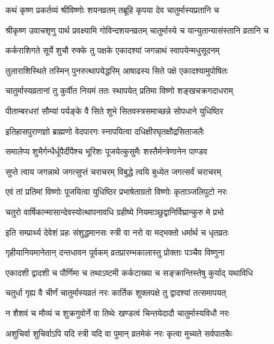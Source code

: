 
\twolineshloka
{कथं कृष्ण प्रकर्तव्यं श्रीविष्णोः शयनव्रतम्}
{तब्रूहि कृपया देव चातुर्मास्यप्रतानि च} %

\twolineshloka
{श्रीकृष्ण उवाचशृणु पार्थ प्रवक्ष्यामि गोविन्दशयनव्रतम्}
{चातुर्मास्ये च यान्युतान्यासंस्तानि व्रतानि च} %

\twolineshloka
{कर्कराशिगते सूर्ये शुचौ रुक्के तु पक्षके}
{एकादश्यां जगन्नाथं स्वापयेन्मधुसूदनम्} %

\twolineshloka
{तुलाराशिस्थिते तस्मिन् पुनरुत्थापयेद्धरिम्}
{आषाढस्य सिते पक्षे एकादश्यामुपोषितः} %

\twolineshloka
{चातुर्मास्यव्रतानां तु कुर्वीत नियमं ततः}
{स्थापयेत् प्रतिमा विष्णो शङ्खचक्रगदाधराम्} %

\twolineshloka
{पीताम्बरधरां सौम्यां पर्यङ्के वै सिते शुभे}
{सितवस्त्रसमाच्छन्ने सोपधाने युधिष्ठिर} %

\twolineshloka
{इतिहासपुराणज्ञो ब्राह्मणो वेदपारगः}
{स्नापयित्वा दधिक्षीरघृतक्षौद्रसिताजलैः} %

\twolineshloka
{समालेप्य शुभैर्गन्धैर्धूपैर्दीपैश्च भूरिशः}
{पूजयेत्कुसुमैः शस्तैर्मन्त्रेणानेन पाण्डव} %

\twolineshloka
{सुप्ते त्वाय जगन्नाथे जगत्सुप्तं चराचरम्}
{विबुद्धे त्वयि बुध्येत जगत्सर्वं चराचरम्} %

\twolineshloka
{एवं तां प्रतिमां विष्णोः पूजयित्वा युधिष्ठिर}
{प्रभाषेताग्रतो विष्णोः कृताञ्जलिपुटो नरः} %

\twolineshloka
{चतुरो वार्षिकान्मासान्देवस्योत्थापनावधि}
{ग्रहीष्ये नियमाञ्छुद्वानिर्विघ्रान्कुरु मे प्रभो} %

\twolineshloka
{इति सम्प्रार्थ्य देवेशं प्रहः संशुद्धमानसः}
{स्त्री वा नरो वा मद्भक्तो धर्मार्थ च धृतव्रतः} %

\twolineshloka
{गृहीयानियमानेतान् दन्तधावन पूर्वकम्}
{व्रतप्रारम्भकालास्तु प्रोक्ताः पञ्चैव विष्णुना} %

\twolineshloka
{एकादशी द्वादशी च पौर्णिमा च तथाऽष्टमी}
{कर्कटाख्या च सङ्क्रान्तिस्तेषु कुर्याद् यथाविधि} %

\twolineshloka
{चतुर्धा गृह्य वै चीर्णं चातुर्मास्यव्रतं नरः}
{कार्तिक शुक्लपक्षे तु द्वादश्यां तत्समापयत्} %

\twolineshloka
{न शैशवं च मौव्यं च शुक्रगुवोर्ने वा तिथेः}
{खण्डत्वं चिन्तयेदादौ चातुर्मास्यविधौ नरः} %

\twolineshloka
{अशुचिर्वा शुचिर्वाऽपि यदि स्त्री यदि वा पुमान्}
{व्रतमेकं नरः कृत्वा मुच्यते सर्वपातकैः} %

